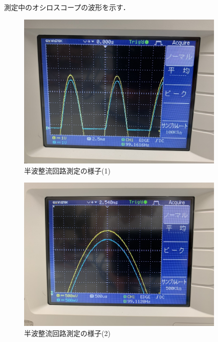 \documentclass[titlepage]{jarticle}
\begin{document}
測定中のオシロスコープの波形を示す．
\begin{figure}[H]
    \begin{center}
        \includegraphics[width=10cm]{image/diode/S__19873810.jpg}
        \caption{半波整流回路測定の様子(1)}
        \label{fig:半波整流回路測定の様子(1)}
    \end{center}
\end{figure}

\begin{figure}[H]
    \begin{center}
        \includegraphics[width=10cm]{image/diode/S__19873806.jpg}
        \caption{半波整流回路測定の様子(2)}
        \label{fig:半波整流回路測定の様子(2)}
    \end{center}
\end{figure}
\end{document}
